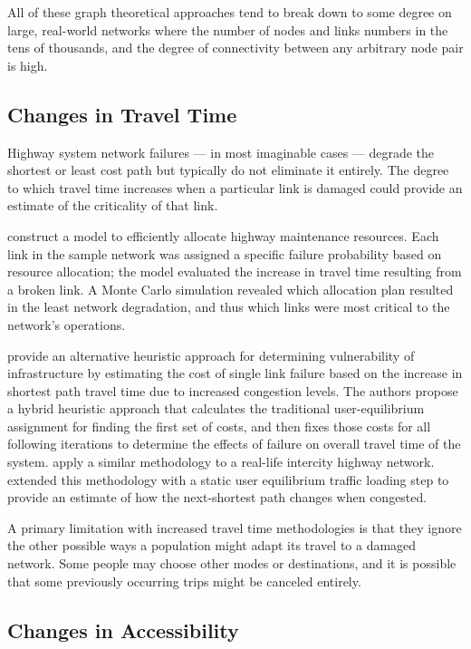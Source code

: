 \documentclass[3p, authoryear]{elsarticle} %
\begin{document}
All of these graph theoretical approaches tend to break down to some degree on
large, real-world networks where the number of nodes and links numbers in the tens
of thousands, and the degree of connectivity between any arbitrary node pair is
high.

\hypertarget{changes-in-travel-time}{%
\subsection{Changes in Travel Time}\label{changes-in-travel-time}}

Highway system network failures --- in most imaginable cases --- degrade the
shortest or least cost path but typically do not eliminate it entirely. The degree
to which travel time increases when a particular link is damaged could provide an
estimate of the criticality of that link.

\citet{peeta2010} construct a model to efficiently allocate
highway maintenance resources. Each link in the sample network was
assigned a specific failure probability based on resource allocation;
the model evaluated the increase in travel time resulting from a broken
link. A Monte Carlo simulation revealed which allocation plan resulted in the least
network degradation, and thus which links were most critical to the network's
operations.

\citet{ibrahim2011} provide an alternative heuristic approach for determining
vulnerability of infrastructure by estimating the cost of single link failure
based on the increase in shortest path travel time due to increased congestion
levels. The authors propose a hybrid heuristic approach that calculates the
traditional user-equilibrium assignment for finding the first set of costs, and
then fixes those costs for all following iterations to determine the effects of
failure on overall travel time of the system. \citet{omer2013} apply a similar methodology
to a real-life intercity highway network. \citet{jaller2015} extended this methodology
with a static user equilibrium traffic loading step to provide an estimate of
how the next-shortest path changes when congested.

A primary limitation with increased travel time methodologies is that they
ignore the other possible ways a population might adapt its travel to a damaged
network. Some people may choose other modes or destinations, and it is possible
that some previously occurring trips might be canceled entirely.

\hypertarget{changes-in-accessibility}{%
\subsection{Changes in Accessibility}\label{changes-in-accessibility}}
\end{document}
